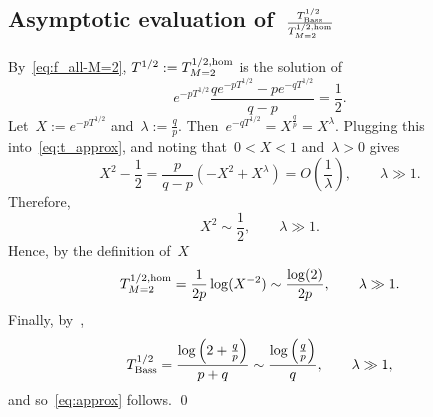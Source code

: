 \documentclass[review]{elsarticle}
\newtheorem{lemma}{Lemma}
\begin{document}
\subsection{Asymptotic evaluation of~$\frac{T_{\rm Bass}^{1/2}}{T^{1/2, {\rm hom}}_{M=2}}$}
By~\eqref{eq:f_all-M=2}, $T^{1/2}:=T_{M=2}^{1/2, {\rm hom}}$ is the solution of 
\begin{equation}
\label{eq:t_approx}
e^{-pT^{1/2}}\frac{qe^{-pT^{1/2}}-pe^{-qT^{1/2}}}{q-p} = \frac{1}{2}.
\end{equation}
Let~$X:=e^{-pT^{1/2}}$ and~$\lambda:=\frac{q}{p}$. Then~$e^{-qT^{1/2}}=X^{\frac{q}{p}}=X^{\lambda}$. Plugging this into~\eqref{eq:t_approx}, and noting that~$0<X<1$ and~$\lambda > 0$ gives
\begin{equation*}
\label{eq:X_first}
X^2 - \frac{1}{2} = \frac{p}{q-p}\left(-X^2+X^{\lambda}\right)=O\left(\frac{1}{\lambda}\right), \qquad \lambda\gg 1.
\end{equation*}  
Therefore, 
\begin{equation*}
\label{eq:X_1^2}
X^2 \sim \frac{1}{2}, \qquad \lambda\gg 1.
\end{equation*}
Hence, by the definition of~$X$
\begin{equation*}
\label{eq:T_X}
T^{1/2, {\rm hom}}_{M=2} = \frac{1}{2p}\log(X^{-2})\sim \frac{\log(2)}{2p}, \qquad \lambda\gg 1.
\end{equation*}
Finally, by~\citealp[Lemma 11]{OR-10}, 
$$T_{\rm Bass}^{1/2} = \frac{\log\left(2+\frac{q}{p}\right)}{p+q}\sim \frac{\log\left(\frac{q}{p}\right)}{q},  \qquad \lambda\gg 1,
$$
 and so~\eqref{eq:approx} follows. \qed
\end{document}
